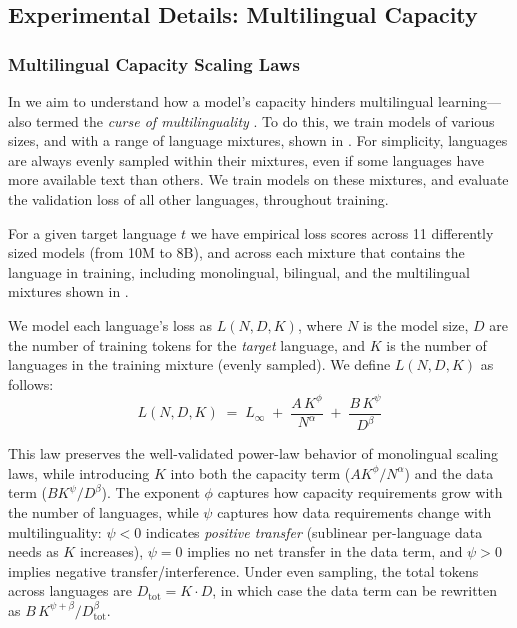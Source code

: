 \subsection{Experimental Details: Multilingual Capacity}
\label{app:model-capacity-exp-details}

\subsubsection{Multilingual Capacity Scaling Laws}



In  we aim to understand how a model's capacity hinders multilingual learning---also termed the \emph{curse of multilinguality} \citep{conneau2019unsupervised, chang2024multilinguality}.
To do this, we train models of various sizes, and with a range of language mixtures, shown in .
For simplicity, languages are always evenly sampled within their mixtures, even if some languages have more available text than others.
We train models on these mixtures, and evaluate the validation loss of all other languages, throughout training.

For a given target language $t$ we have empirical loss scores across 11 differently sized models (from 10M to 8B), and across each mixture that contains the language in training, including monolingual, bilingual, and the multilingual mixtures shown in .

We model each language's loss as $L(N,D,K)$, where $N$ is the model size, $D$ are the number of training tokens for the \emph{target} language, and $K$ is the number of languages in the training mixture (evenly sampled).
We define $L(N,D,K)$ as follows:
\begin{equation}
  L(N,D,K)
  \;=\;
  L_{\infty}
  \;+\;
  \frac{A\,K^{\phi}}{N^{\alpha}}
  \;+\;
  \frac{B\,K^{\psi}}{D^{\beta}}
\label{eq:capacity-eq}
\end{equation}

This law preserves the well-validated power-law behavior of monolingual scaling laws, while introducing $K$ into both the capacity term ($A K^{\phi}/N^{\alpha}$) and the data term ($B K^{\psi}/D^{\beta}$).
The exponent $\phi$ captures how capacity requirements grow with the number of languages, while $\psi$ captures how data requirements change with multilinguality: $\psi<0$ indicates \emph{positive transfer} (sublinear per-language data needs as $K$ increases), $\psi=0$ implies no net transfer in the data term, and $\psi>0$ implies negative transfer/interference.
Under even sampling, the total tokens across languages are $D_{\mathrm{tot}} = K\cdot D$, in which case the data term can be rewritten as $B\,K^{\psi+\beta}/D_{\mathrm{tot}}^{\beta}$.


